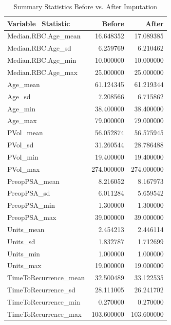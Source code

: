 \documentclass[
]{article}
\begin{document}
\begin{longtable}[t]{lrr}
\caption{\label{tab:compare-before-after}Summary Statistics Before vs. After Imputation}\\
\toprule
Variable\_Statistic & Before & After\\
\midrule
Median.RBC.Age\_mean & 16.648352 & 17.089385\\
Median.RBC.Age\_sd & 6.259769 & 6.210462\\
Median.RBC.Age\_min & 10.000000 & 10.000000\\
Median.RBC.Age\_max & 25.000000 & 25.000000\\
Age\_mean & 61.124345 & 61.219344\\
\addlinespace
Age\_sd & 7.208566 & 6.715862\\
Age\_min & 38.400000 & 38.400000\\
Age\_max & 79.000000 & 79.000000\\
PVol\_mean & 56.052874 & 56.575945\\
PVol\_sd & 31.260544 & 28.786488\\
\addlinespace
PVol\_min & 19.400000 & 19.400000\\
PVol\_max & 274.000000 & 274.000000\\
PreopPSA\_mean & 8.216052 & 8.167973\\
PreopPSA\_sd & 6.011284 & 5.659542\\
PreopPSA\_min & 1.300000 & 1.300000\\
\addlinespace
PreopPSA\_max & 39.000000 & 39.000000\\
Units\_mean & 2.454213 & 2.446114\\
Units\_sd & 1.832787 & 1.712699\\
Units\_min & 1.000000 & 1.000000\\
Units\_max & 19.000000 & 19.000000\\
\addlinespace
TimeToRecurrence\_mean & 32.500489 & 33.122535\\
TimeToRecurrence\_sd & 28.111005 & 26.241702\\
TimeToRecurrence\_min & 0.270000 & 0.270000\\
TimeToRecurrence\_max & 103.600000 & 103.600000\\
\bottomrule
\end{longtable}
\end{document}
